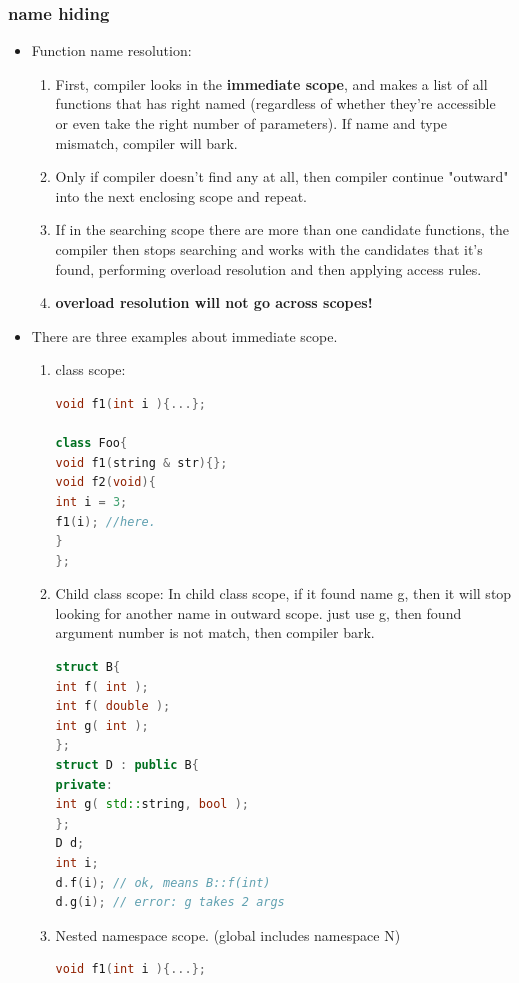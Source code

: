 \documentclass[a4paper,12pt,twoside]{book}
\begin{document}
\subsubsection{name hiding}
\begin{itemize}
\item Function name resolution:
\begin{enumerate}
\item First, compiler looks in the \textbf{immediate scope},  and makes a list of all functions that has right named  (regardless of whether they're accessible or even take the right number of parameters). If name and type mismatch, compiler will bark.

\item Only if compiler doesn't find any at all, then compiler continue "outward" into the next enclosing scope and repeat.

\item If in the searching scope there are more than one candidate functions, the compiler then stops searching and works with the candidates that it's found, performing overload resolution and then applying access rules.

\item \textbf{overload resolution will not go across scopes!}
\end{enumerate}

\item There are three examples about immediate scope.
\begin{enumerate}
\item class scope:
\begin{lstlisting}[frame=single, language=c++]
void f1(int i ){...};

class Foo{
void f1(string & str){};
void f2(void){
int i = 3;
f1(i); //here.
}
};
\end{lstlisting}

\item Child class scope: In child class scope, if it found name g, then it will stop looking for another name in outward scope. just use g, then found argument number is not match, then compiler bark.
\begin{lstlisting}[frame=single, language=c++]
struct B{
int f( int );
int f( double );
int g( int );
};
struct D : public B{
private:
int g( std::string, bool );
};
D d;
int i;
d.f(i); // ok, means B::f(int)
d.g(i); // error: g takes 2 args
\end{lstlisting}

\item Nested namespace scope. (global includes namespace N)
\begin{lstlisting}[frame=single, language=c++]
void f1(int i ){...};


\end{lstlisting}
\end{enumerate}
\end{itemize}
\end{document}
